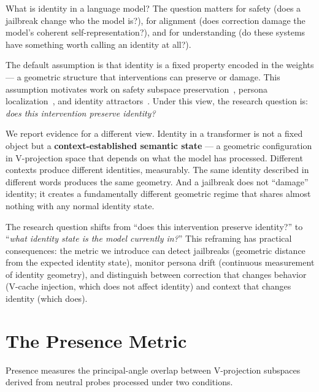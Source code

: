 \documentclass[11pt,a4paper]{article}
\begin{document}
What is identity in a language model? The question matters for safety
(does a jailbreak change who the model is?), for alignment (does
correction damage the model's coherent self-representation?), and for
understanding (do these systems have something worth calling an identity
at all?).

The default assumption is that identity is a fixed property encoded in the
weights --- a geometric structure that interventions can preserve or damage.
This assumption motivates work on safety subspace
preservation~\citep{zhang2025guardspace}, persona
localization~\citep{cintas2025localizing}, and identity
attractors~\citep{vasilenko2026identity}. Under this view, the research
question is: \emph{does this intervention preserve identity?}

We report evidence for a different view. Identity in a transformer is not
a fixed object but a \textbf{context-established semantic state} ---
a geometric configuration in V-projection space that depends on what the
model has processed. Different contexts produce different identities,
measurably. The same identity described in different words produces the
same geometry. And a jailbreak does not ``damage'' identity; it creates
a fundamentally different geometric regime that shares almost nothing with
any normal identity state.

The research question shifts from ``does this intervention preserve
identity?'' to ``\emph{what identity state is the model currently in?}''
This reframing has practical consequences: the metric we introduce can
detect jailbreaks (geometric distance from the expected identity state),
monitor persona drift (continuous measurement of identity geometry), and
distinguish between correction that changes behavior (V-cache injection,
which does not affect identity) and context that changes identity (which
does).

\section{The Presence Metric}
\label{sec:method}

Presence measures the principal-angle overlap between V-projection
subspaces derived from neutral probes processed under two conditions.
\end{document}
